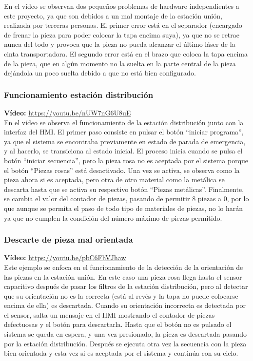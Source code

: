 En el vídeo se observan dos pequeños problemas de hardware independientes a este proyecto, ya que son debidos a un mal montaje de la estación unión, realizada por terceras personas. El primer error está en el separador (encargado de frenar la pieza para poder colocar la tapa encima suya), ya que no se retrae nunca del todo y provoca que la pieza no pueda alcanzar el último láser de la cinta transportadora. El segundo error está en el brazo que coloca la tapa encima de la pieza, que en algún momento no la suelta en la parte central de la pieza dejándola un poco suelta debido a que no está bien configurado. 

\clearpage



\subsubsection{Funcionamiento estación distribución}

\textbf{Vídeo:} \url{https://youtu.be/nUW7nG6U8uE} \\

En el vídeo se observa el funcionamiento de la estación distribución junto con la interfaz del HMI. El primer paso consiste en pulsar el botón “iniciar programa”, ya que el sistema se encontraba previamente en estado de parada de emergencia, y al hacerlo, se transiciona al estado inicial. El proceso inicia cuando se pulsa el botón ``iniciar secuencia'', pero la pieza rosa no es aceptada por el sistema porque el botón ``Piezas rosas'' está desactivado. Una vez se activa, se observa como la pieza ahora si es aceptada, pero otra de otro material como la metálica se descarta hasta que se activa su respectivo botón ``Piezas metálicas''. Finalmente, se cambia el valor del contador de piezas, pasando de permitir 8 piezas a 0, por lo que aunque se permita el paso de todo tipo de materiales de piezas, no lo harán ya que no cumplen la condición del número máximo de piezas permitido. \\

\subsubsection{Descarte de pieza mal orientada}

\textbf{Vídeo:} \url{https://youtu.be/pbC6FhVJhaw} \\

Este ejemplo se enfoca en el funcionamiento de la detección de la orientación de las piezas en la estación unión. En este caso una pieza rosa llega hasta el sensor capacitivo después de pasar los filtros de la estación distribución, pero al detectar que su orientación no es la correcta (está al revés y la tapa no puede colocarse encima de ella) es descartada. Cuando su orientación incorrecta es detectada por el sensor, salta un mensaje en el HMI mostrando el contador de piezas defectuosas y el botón para descartarla. Hasta que el botón no es pulsado el sistema se queda en espera, y una vez presionado, la pieza es descartada pasando por la estación distribución. Después se ejecuta otra vez la secuencia con la pieza bien orientada y esta vez si es aceptada por el sistema y continúa con su ciclo. 

